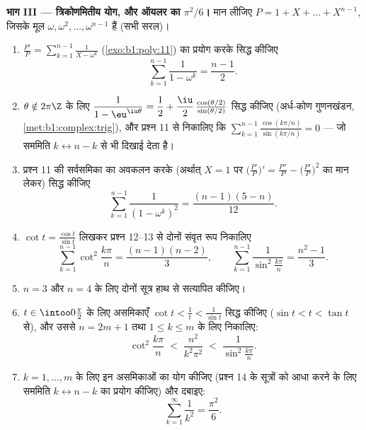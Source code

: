 \begin{problem}
\medskip \noindent\textbf{भाग III --- त्रिकोणमितीय योग, और ऑयलर का
$\pi^2/6$।} मान लीजिए $P = 1 + X + \dots + X^{n-1}$, जिसके मूल $\omega,
\omega^2, \dots, \omega^{n-1}$ हैं (सभी सरल)।
\begin{enumerate}[resume]
  \item $\frac{P'}P = \sum_{k=1}^{n-1}\frac1{X - \omega^k}$
  (\cref{exo:b1:poly:11}) का प्रयोग करके सिद्ध कीजिए
        \[
        \sum_{k=1}^{n-1}\frac{1}{1 - \omega^k} = \frac{n-1}2 .
        \]
  \item $\theta \notin 2\pi\Z$ के लिए $\dfrac1{1 - \eu^{\iu\theta}} =
  \dfrac12 + \dfrac\iu2\,\frac{\cos(\theta/2)}{\sin(\theta/2)}$ सिद्ध कीजिए
  (अर्ध-कोण गुणनखंडन, \cref{met:b1:complex:trig}), और प्रश्न 11 से निकालिए
  कि $\sum_{k=1}^{n-1} \frac{\cos(k\pi/n)}{\sin(k\pi/n)} = 0$ --- जो सममिति
  $k \leftrightarrow n - k$ से भी दिखाई देता है।
  \item प्रश्न 11 की सर्वसमिका का अवकलन करके (अर्थात् $X = 1$ पर
  $\bigl(\frac{P'}P\bigr)' = \frac{P''}P - \bigl(\frac{P'}P\bigr)^2$ का मान
  लेकर) सिद्ध कीजिए
        \[
        \sum_{k=1}^{n-1}\frac{1}{(1 - \omega^k)^2}
        = \frac{(n-1)(5-n)}{12} .
        \]
  \item $\cot t = \frac{\cos t}{\sin t}$ लिखकर प्रश्न 12--13 से दोनों संवृत
  रूप निकालिए
        \[
        \sum_{k=1}^{n-1}\cot^2\frac{k\pi}n = \frac{(n-1)(n-2)}3,
        \qquad
        \sum_{k=1}^{n-1}\frac1{\sin^2\frac{k\pi}n}
        = \frac{n^2-1}3 .
        \]
  \item $n = 3$ और $n = 4$ के लिए दोनों सूत्र हाथ से सत्यापित कीजिए।
  \item $t \in \intoo0{\frac\pi2}$ के लिए असमिकाएँ $\cot t < \frac1t <
  \frac1{\sin t}$ सिद्ध कीजिए ($\sin t < t < \tan t$ से), और उससे $n = 2m +
  1$ तथा $1 \leq k \leq m$ के लिए निकालिए:
        \[
        \cot^2\frac{k\pi}n \;<\; \frac{n^2}{k^2\pi^2}
        \;<\; \frac1{\sin^2\frac{k\pi}n} .
        \]
  \item $k = 1, \dots, m$ के लिए इन असमिकाओं का योग कीजिए (प्रश्न 14 के
  सूत्रों को आधा करने के लिए सममिति $k \leftrightarrow n - k$ का प्रयोग
  कीजिए) और दबाइए:
        \[
        \sum_{k=1}^{\infty}\frac1{k^2} = \frac{\pi^2}6 .
        \]
\end{enumerate}


\end{problem}
